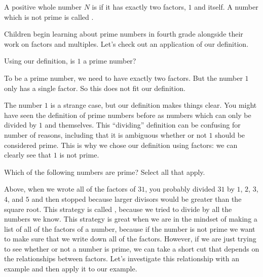 \documentclass{ximera}
\begin{document}
\begin{definition}
A positive whole number $N$ is  if it has exactly two factors, $1$ and itself. A number which is not prime is called .
\end{definition}

Children begin learning about prime numbers in fourth grade alongside their work on factors and multiples. Let's check out an application of our definition.

\begin{question}
Using our definition, is $1$ a prime number?

\begin{multipleChoice}
\begin{feedback}[correct]
 To be a prime number, we need to have exactly two factors. But the number $1$ only has a single factor. So this does not fit our definition.
\end{feedback}
\end{multipleChoice}
\end{question}

The number $1$ is a strange case, but our definition makes things clear. You might have seen the definition of prime numbers before as numbers which can only be divided by $1$ and themselves. This ``dividing'' definition can be confusing for number of reasons, including that it is ambiguous whether or not $1$ should be considered prime. This is why we chose our definition using factors: we can clearly see that $1$ is not prime.

\begin{question}
Which of the following numbers are prime? Select all that apply.
\begin{selectAll}
\end{selectAll}
\end{question}


Above, when we wrote all of the factors of $31$, you probably divided $31$ by $1$, $2$, $3$, $4$, and $5$ and then stopped because larger divisors would be greater than the square root. This strategy is called , because we tried to divide by all the numbers we know. This strategy is great when we are in the mindset of making a list of all of the factors of a number, because if the number is not prime we want to make sure that we write down all of the factors. However, if we are just trying to see whether or not a number is prime, we can take a short cut that depends on the relationships between factors. Let's investigate this relationship with an example and then apply it to our example.
\end{document}
